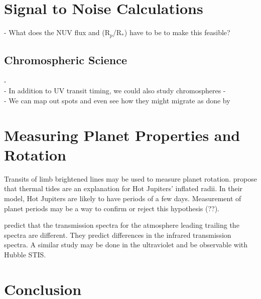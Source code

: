 \documentclass[manuscript]{aastex}
\begin{document}
\section{Signal to Noise Calculations} \label{labl:sn}
- What does the NUV flux and (R$_p$/R$_*$) have to be to make this feasible?

\subsection{Chromospheric Science} \label{labl:cscience}
- \\
- In addition to UV transit timing, we could also study chromospheres
- \\
- We can map out spots and even see how they might migrate as done by \citet{2010arXiv1002.4113H}

\section{Measuring Planet Properties and Rotation}
Transits of limb brightened lines may be used to measure planet rotation. \citet{socrates} propose that thermal tides are an explanation for Hot Jupiters' inflated radii. In their model, Hot Jupiters are likely to have periods of a few days. Measurement of planet periods may be a way to confirm or reject this hypothesis (??).

\citet{fortney} predict that the transmission spectra for the atmosphere leading trailing the spectra are different. They predict differences in the infrared transmission spectra. A similar study may be done in the ultraviolet and be observable with Hubble STIS.

\section{Conclusion}


  
\end{document}
